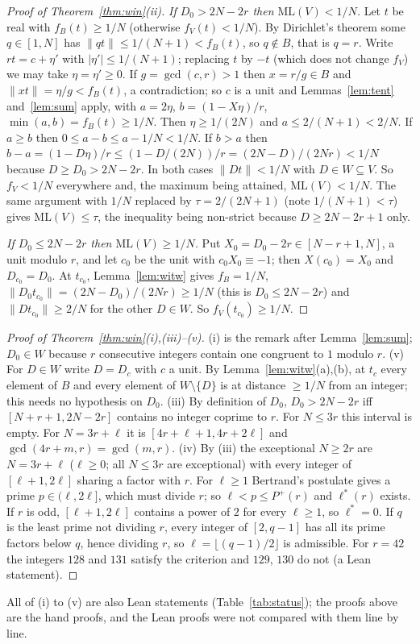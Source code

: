 \documentclass[11pt]{article}
\theoremstyle{definition}
\theoremstyle{remark}
\newcommand{\nd}[1]{\lVert #1\rVert}
\newcommand{\ML}{\mathrm{ML}}
\begin{document}
\begin{proof}[Proof of Theorem~\ref{thm:win}(ii)]
\emph{If $D_0>2N-2r$ then $\ML(V)<1/N$.} Let $t$ be real with $f_B(t)\ge1/N$ (otherwise $f_V(t)<1/N$). By Dirichlet's theorem some $q\in[1,N]$ has $\nd{qt}\le1/(N+1)<f_B(t)$, so $q\notin B$, that is $q=r$. Write $rt=c+\eta'$ with $|\eta'|\le1/(N+1)$; replacing $t$ by $-t$ (which does not change $f_V$) we may take $\eta=\eta'\ge0$. If $g=\gcd(c,r)>1$ then $x=r/g\in B$ and $\nd{xt}=\eta/g<f_B(t)$, a contradiction; so $c$ is a unit and Lemmas~\ref{lem:tent} and~\ref{lem:sum} apply, with $a=2\eta$, $b=(1-X\eta)/r$, $\min(a,b)=f_B(t)\ge1/N$. Then $\eta\ge1/(2N)$ and $a\le2/(N+1)<2/N$. If $a\ge b$ then $0\le a-b\le a-1/N<1/N$. If $b>a$ then $b-a=(1-D\eta)/r\le(1-D/(2N))/r=(2N-D)/(2Nr)<1/N$ because $D\ge D_0>2N-2r$. In both cases $\nd{Dt}<1/N$ with $D\in W\subseteq V$. So $f_V<1/N$ everywhere and, the maximum being attained, $\ML(V)<1/N$. The same argument with $1/N$ replaced by $\tau=2/(2N+1)$ (note $1/(N+1)<\tau$) gives $\ML(V)\le\tau$, the inequality being non-strict because $D\ge2N-2r+1$ only.

\emph{If $D_0\le2N-2r$ then $\ML(V)\ge1/N$.} Put $X_0=D_0-2r\in[N-r+1,N]$, a unit modulo $r$, and let $c_0$ be the unit with $c_0X_0\equiv-1$; then $X(c_0)=X_0$ and $D_{c_0}=D_0$. At $t_{c_0}$, Lemma~\ref{lem:witw} gives $f_B=1/N$, $\nd{D_0t_{c_0}}=(2N-D_0)/(2Nr)\ge1/N$ (this is $D_0\le2N-2r$) and $\nd{Dt_{c_0}}\ge2/N$ for the other $D\in W$. So $f_V(t_{c_0})\ge1/N$.
\end{proof}

\begin{proof}[Proof of Theorem~\ref{thm:win}(i),(iii)--(v)]
(i) is the remark after Lemma~\ref{lem:sum}; $D_0\in W$ because $r$ consecutive integers contain one congruent to $1$ modulo $r$. (v) For $D\in W$ write $D=D_c$ with $c$ a unit. By Lemma~\ref{lem:witw}(a),(b), at $t_c$ every element of $B$ and every element of $W\setminus\{D\}$ is at distance $\ge1/N$ from an integer; this needs no hypothesis on $D_0$. (iii) By definition of $D_0$, $D_0>2N-2r$ iff $[N+r+1,2N-2r]$ contains no integer coprime to $r$. For $N\le3r$ this interval is empty. For $N=3r+\ell$ it is $[4r+\ell+1,4r+2\ell]$ and $\gcd(4r+m,r)=\gcd(m,r)$. (iv) By (iii) the exceptional $N\ge2r$ are $N=3r+\ell$ ($\ell\ge0$; all $N\le3r$ are exceptional) with every integer of $[\ell+1,2\ell]$ sharing a factor with $r$. For $\ell\ge1$ Bertrand's postulate gives a prime $p\in(\ell,2\ell]$, which must divide $r$; so $\ell<p\le P^+(r)$ and $\ell^*(r)$ exists. If $r$ is odd, $[\ell+1,2\ell]$ contains a power of $2$ for every $\ell\ge1$, so $\ell^*=0$. If $q$ is the least prime not dividing $r$, every integer of $[2,q-1]$ has all its prime factors below $q$, hence dividing $r$, so $\ell=\lfloor(q-1)/2\rfloor$ is admissible. For $r=42$ the integers $128$ and $131$ satisfy the criterion and $129$, $130$ do not (a Lean statement).
\end{proof}
All of (i) to (v) are also Lean statements (Table~\ref{tab:status}); the proofs above are the hand proofs, and the Lean proofs were not compared with them line by line.
\end{document}
